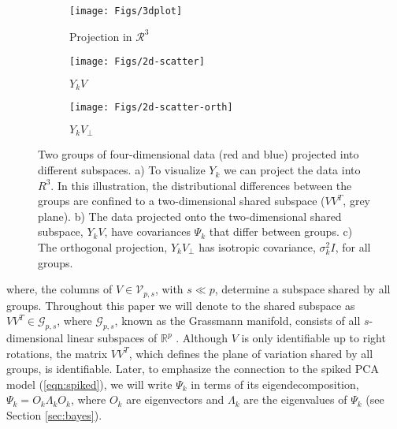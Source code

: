 \documentclass[12pt]{article}
\begin{document}
\begin{figure}[t]
    \centering
    \begin{subfigure}[b]{0.25\textwidth}
        \texttt{[image: Figs/3dplot]}
        \caption{Projection in $\mathcal{R}^3$}
        \label{fig:3dplot}
    \end{subfigure}
\quad
    \begin{subfigure}[b]{0.25\textwidth}
        \texttt{[image: Figs/2d-scatter]}
        \caption{$Y_kV$}
        \label{fig:2dscatter}
    \end{subfigure}
\quad 
    \begin{subfigure}[b]{0.25\textwidth}
        \texttt{[image: Figs/2d-scatter-orth]}
        \caption{$Y_kV_{\perp}$}
        \label{fig:2dscatterorth}
    \end{subfigure}
    \caption{ Two groups of four-dimensional data (red and blue)
      projected into different subspaces.  a) To visualize $Y_k$ we
      can project the data into $R^3$.  In this illustration, the
      distributional differences between the groups are confined to a
      two-dimensional shared subspace ($VV^T$, grey plane).  b) The
      data projected onto the two-dimensional shared subspace,
      $Y_kV$, have covariances $\Psi_k$ that differ between
      groups. c) The orthogonal projection, $Y_kV_{\perp}$
      has isotropic covariance, $\sigma_k^2I$, for all groups.  }
\label{fig:shared}
\end{figure}

%
\noindent where, the columns of $V \in \mathcal{V}_{p, s}$, with
$s \ll p$, determine a subspace shared by all groups.  Throughout this
paper we will denote to the shared subspace as
$VV^T \in \mathcal G_{p,s}$, where $\mathcal G_{p,s}$, known as the
Grassmann manifold, consists of all $s$-dimensional linear subspaces
of $\mathbb{R}^p$ \citep{Chikuse2012}.  Although $V$ is only
identifiable up to right rotations, the matrix $VV^T$, which defines
the plane of variation shared by all groups, is identifiable.  Later,
to emphasize the connection to the spiked PCA model
(\ref{eqn:spiked}), we will write $\Psi_k$ in terms of its
eigendecomposition, $\Psi_k = O_k\Lambda_kO_k$, where $O_k$ are
eigenvectors and $\Lambda_k$ are the eigenvalues of $\Psi_k$ (see
Section \ref{sec:bayes}).
\end{document}
